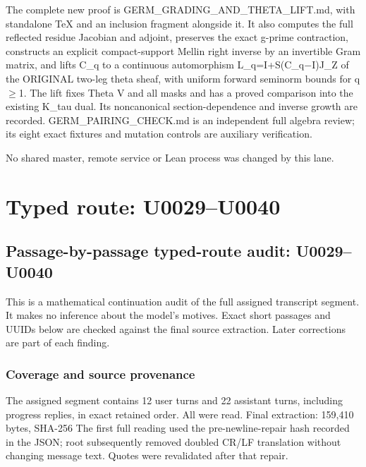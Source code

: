 The complete new proof is GERM\_GRADING\_AND\_THETA\_LIFT.md, with
standalone TeX and an inclusion fragment alongside it. It also computes
the full reflected residue Jacobian and adjoint, preserves the exact
g-prime contraction, constructs an explicit compact-support Mellin right
inverse by an invertible Gram matrix, and lifts C\_q to a continuous
automorphism L\_q=I+S(C\_q\allowbreak{}\ensuremath{−}\allowbreak{}I)J\_Z
of the ORIGINAL two-leg theta sheaf, with uniform forward seminorm
bounds for q\allowbreak{}\ensuremath{≥}\allowbreak{}1. The lift fixes
Theta V and all masks and has a proved comparison into the existing
K\_tau dual. Its noncanonical section-dependence and inverse growth are
recorded. GERM\_PAIRING\_CHECK.md is an independent full algebra review;
its eight exact fixtures and mutation controls are auxiliary
verification.

No shared master, remote service or Lean process was changed by this
lane.

\clearpage

\section{Typed route: U0029--U0040}\label{typed-route-u0029u0040}

\subsection{Passage-by-passage typed-route audit:
U0029--U0040}\label{passage-by-passage-typed-route-audit-u0029u0040}

This is a mathematical continuation audit of the full assigned
transcript segment. It makes no inference about the model's motives.
Exact short passages and UUIDs below are checked against the final
source extraction. Later corrections are part of each finding.

\subsubsection{Coverage and source
provenance}\label{coverage-and-source-provenance}

The assigned segment contains 12 user turns and 22 assistant turns,
including progress replies, in exact retained order. All were read.
Final extraction: 159,410 bytes, SHA-256
\protect{}
The first full reading used the pre-newline-repair hash recorded in the
JSON; root subsequently removed doubled CR/LF translation without
changing message text. Quotes were revalidated after that repair.

